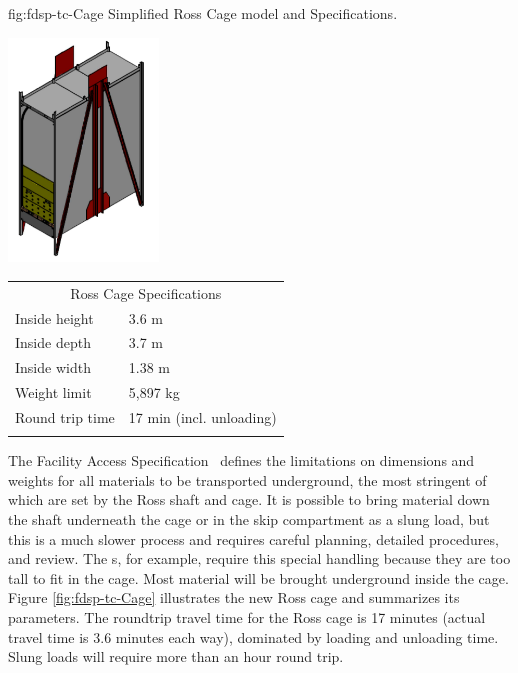 \begin{dunefigure}
{fig:fdsp-tc-Cage}
{Simplified Ross Cage model and Specifications.}
\parbox{2.1in}{\includegraphics[width=0.3\textwidth]{graphics/Cage-view.pdf}}
\qquad\hspace{10pt}
\begin{minipage}{0.5\textwidth}%
\begin{tabular}{p{3.4cm}p{3.4cm}}        
\multicolumn{2}{c}{Ross Cage Specifications}\\ \toprowrule
Inside height & 3.6 m\\ \colhline
Inside depth  & 3.7 m \\ \colhline
Inside width  & 1.38 m \\ \colhline
Weight limit  &  5,897 kg \\ \colhline
Round trip \newline time & 17 min \newline (incl. unloading) \\ \colhline
\end{tabular}
\end{minipage}
\end{dunefigure}

The  Facility Access Specification~\cite{bib:docdb328} defines the limitations on dimensions and weights for all materials to be transported underground, the most stringent of which are set by the Ross shaft and cage. 
It is possible to bring material down the shaft underneath the cage or in the skip compartment  as a slung load, but this is a much slower process and requires careful planning, detailed procedures, and review. 
The  s, for example, require this special handling because they are too tall to fit in the cage. 
Most material will be brought underground inside the cage. Figure \ref{fig:fdsp-tc-Cage} illustrates the new Ross cage and summarizes its parameters.  
The roundtrip travel time for the Ross cage is 17 minutes (actual travel time is \num{3.6} minutes each way), dominated by loading and unloading time.  
Slung loads will require more than an hour round trip.



